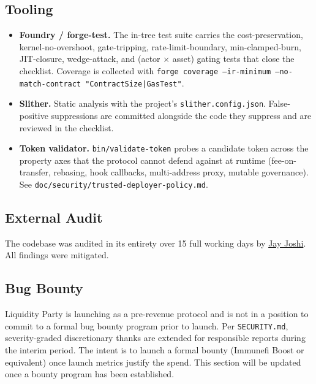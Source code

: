\documentclass[11pt]{article}
\begin{document}
\subsection{Tooling}

\begin{itemize}
  \item \textbf{Foundry / forge-test.} The in-tree test suite carries
        the cost-preservation, kernel-no-overshoot, gate-tripping,
        rate-limit-boundary, min-clamped-burn, JIT-closure,
        wedge-attack, and (actor $\times$ asset) gating tests that
        close the checklist.
        Coverage is collected with
        \texttt{forge coverage --ir-minimum --no-match-contract "ContractSize|GasTest"}.
  \item \textbf{Slither.} Static analysis with the project's
        \texttt{slither.config.json}. False-positive suppressions are
        committed alongside the code they suppress and are reviewed in the
        checklist.
  \item \textbf{Token validator.} \texttt{bin/validate-token} probes a
        candidate token across the property axes that the protocol cannot
        defend against at runtime (fee-on-transfer, rebasing, hook
        callbacks, multi-address proxy, mutable governance). See
        \texttt{doc/\allowbreak security/\allowbreak trusted-deployer-policy.md}.
\end{itemize}

\subsection{External Audit}
\label{sec:external-audit}

The codebase was audited in its entirety over 15 full working days by
\href{https://github.com/jayjoshix}{Jay Joshi}. All findings were
mitigated.

\subsection{Bug Bounty}

Liquidity Party is launching as a pre-revenue protocol and is not in a
position to commit to a formal bug bounty program prior to launch. Per
\texttt{SECURITY.md}, severity-graded discretionary thanks are extended for
responsible reports during the interim period. The intent is to launch a
formal bounty (Immunefi Boost or equivalent) once launch metrics justify the
spend. This section will be updated once a bounty program has been
established.
\end{document}
